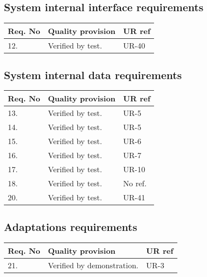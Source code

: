 \subsection{System internal interface requirements}
\begin{center}
    \begin{tabular}{ | l | p{9cm} | l |}
    \hline	
    Req. No & Quality provision  									& UR ref \\ \hline
    	12. & Verified by test.  								& UR-40 \\ \hline
    \end{tabular}
\end{center}

\subsection{System internal data requirements}
\begin{center}
    \begin{tabular}{ | l | p{9cm} | l |}
    \hline	
    Req. No & Quality provision  								& UR ref \\ \hline
		13. & Verified by test.  								& UR-5 \\ \hline 	
    	14. & Verified by test.  								& UR-5 \\ \hline
		15. & Verified by test.  								& UR-6 \\ \hline
		16. & Verified by test.  								& UR-7 \\ \hline
		17. & Verified by test.  								& UR-10 \\ \hline 	
		18. & Verified by test.  								& No ref. \\ \hline
		20. & Verified by test.  								& UR-41 \\ \hline
    \end{tabular}
\end{center}

\subsection{Adaptations requirements}
\begin{center}
    \begin{tabular}{ | l | p{9cm} | l |}
    \hline
    Req. No & Quality provision  									& UR ref \\ \hline
		21. & Verified by demonstration.  								& UR-3 \\ \hline
    \end{tabular}
\end{center}


